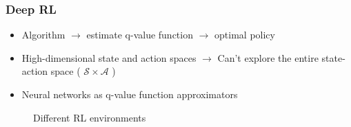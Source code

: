 \documentclass{beamer}
\theoremstyle{remark}
\theoremstyle{plain}
\begin{document}
\begin{frame}
  \frametitle{Deep RL}
\begin{itemize}
     
\item Algorithm $\xrightarrow{}$ estimate q-value function $\xrightarrow{}$ optimal policy \\
\item High-dimensional state and action spaces $\xrightarrow{}$ Can't explore the entire state-action space ( $\mathcal{S} \times \mathcal{A}$ )
\item Neural networks as q-value function approximators
\end{itemize}


\begin{figure}[!ht]
     \hspace{2cm}
     \caption{Different RL environments}
\end{figure}
\end{frame}

\end{document}
